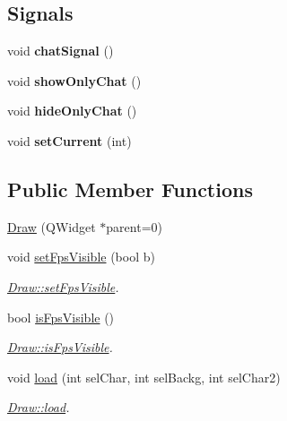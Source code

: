 \subsection*{Signals}
\begin{DoxyCompactItemize}
\item 
\hypertarget{class_draw_af9ed50b9ec6a3bae6a995a394e6c58e3}{}void {\bfseries chat\+Signal} ()\label{class_draw_af9ed50b9ec6a3bae6a995a394e6c58e3}

\item 
\hypertarget{class_draw_ad2ba543f075871b08e4fb22bcfa00a7f}{}void {\bfseries show\+Only\+Chat} ()\label{class_draw_ad2ba543f075871b08e4fb22bcfa00a7f}

\item 
\hypertarget{class_draw_a799aeae3d852fe42b9521f6cef53c41e}{}void {\bfseries hide\+Only\+Chat} ()\label{class_draw_a799aeae3d852fe42b9521f6cef53c41e}

\item 
\hypertarget{class_draw_a8e1664e9a5bdb18ddfedfe8cbc7e9de3}{}void {\bfseries set\+Current} (int)\label{class_draw_a8e1664e9a5bdb18ddfedfe8cbc7e9de3}

\end{DoxyCompactItemize}
\subsection*{Public Member Functions}
\begin{DoxyCompactItemize}
\item 
\hyperlink{class_draw_a04439e9d5f430ebe2c1cf8216b542930}{Draw} (Q\+Widget $\ast$parent=0)
\item 
void \hyperlink{class_draw_a2db5297d01a7a230a1e5a504e22e4b1a}{set\+Fps\+Visible} (bool b)
\begin{DoxyCompactList}\small\item\em \hyperlink{class_draw_a2db5297d01a7a230a1e5a504e22e4b1a}{Draw\+::set\+Fps\+Visible}. \end{DoxyCompactList}\item 
bool \hyperlink{class_draw_a70803e861847ba4d1fce021502eb9d2b}{is\+Fps\+Visible} ()
\begin{DoxyCompactList}\small\item\em \hyperlink{class_draw_a70803e861847ba4d1fce021502eb9d2b}{Draw\+::is\+Fps\+Visible}. \end{DoxyCompactList}\item 
void \hyperlink{class_draw_a14d84222a5d90e9061d5a46ccfae2539}{load} (int sel\+Char, int sel\+Backg, int sel\+Char2)
\begin{DoxyCompactList}\small\item\em \hyperlink{class_draw_a14d84222a5d90e9061d5a46ccfae2539}{Draw\+::load}. \end{DoxyCompactList}\end{DoxyCompactItemize}
